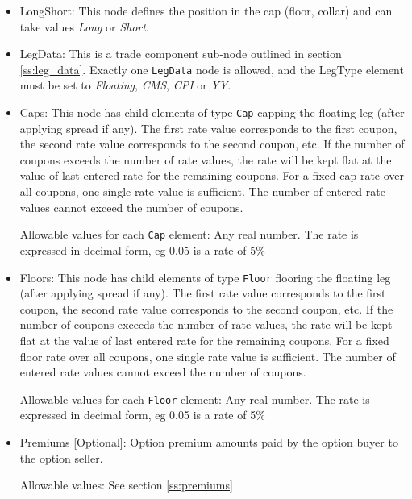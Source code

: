 \begin{itemize}

\item LongShort: This node defines the position in the cap (floor, collar) and can take values \emph{Long} or \emph{Short}.

\item LegData: This is a trade component sub-node outlined in section \ref{ss:leg_data}. Exactly
  one \lstinline!LegData! node is allowed, and the LegType element must
  be set to \emph{Floating}, \emph{CMS}, \emph{CPI} or \emph{YY}.

\item Caps: This node has child elements of type \lstinline!Cap!
  capping the floating leg (after applying spread if any). The first rate value corresponds to the
  first coupon, the second rate value corresponds to the second
  coupon, etc. If the number of coupons exceeds the number of rate
  values, the rate will be kept flat at the value of last entered rate
  for the remaining coupons. For a fixed cap rate over all coupons,
  one single rate value is sufficient. The number of entered rate
  values cannot exceed the number of coupons.  

  Allowable values for each \lstinline!Cap! element: Any real number. The rate is expressed in decimal form, eg 0.05 is
  a rate of 5\%

\item Floors: This node has child elements of type
  \lstinline!Floor! flooring the floating leg (after applying spread if any).  The first rate value
  corresponds to the first coupon, the second rate value corresponds
  to the second coupon, etc. If the number of coupons exceeds the
  number of rate values, the rate will be kept flat at the value of
  last entered rate for the remaining coupons. For a fixed floor rate
  over all coupons, one single rate value is sufficient. The number of
  entered rate values cannot exceed the number of coupons.

  Allowable values for each \lstinline!Floor! element: Any real number. The rate is expressed in decimal form, eg 0.05 is
  a rate of 5\%

\item Premiums [Optional]: Option premium amounts paid by the option buyer to the option seller.

Allowable values:  See section \ref{ss:premiums}

\end{itemize}
